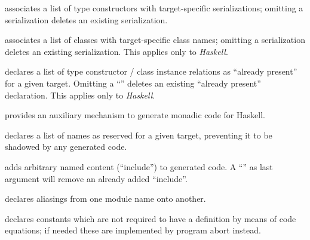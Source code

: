 \begin{isabellebody}
\begin{isamarkuptext}
\begin{description}
  \item \hyperlink{command.HOL.code-type}{\mbox{}} associates a list of type
  constructors with target-specific serializations; omitting a
  serialization deletes an existing serialization.

  \item \hyperlink{command.HOL.code-class}{\mbox{}} associates a list of classes
  with target-specific class names; omitting a serialization deletes
  an existing serialization.  This applies only to \emph{Haskell}.

  \item \hyperlink{command.HOL.code-instance}{\mbox{}} declares a list of type
  constructor / class instance relations as ``already present'' for a
  given target.  Omitting a ``\isa{{\isachardoublequote}{\isacharminus}{\isachardoublequote}}'' deletes an existing
  ``already present'' declaration.  This applies only to
  \emph{Haskell}.

  \item \hyperlink{command.HOL.code-monad}{\mbox{}} provides an auxiliary mechanism
  to generate monadic code for Haskell.

  \item \hyperlink{command.HOL.code-reserved}{\mbox{}} declares a list of names as
  reserved for a given target, preventing it to be shadowed by any
  generated code.

  \item \hyperlink{command.HOL.code-include}{\mbox{}} adds arbitrary named content
  (``include'') to generated code.  A ``\isa{{\isachardoublequote}{\isacharminus}{\isachardoublequote}}'' as last argument
  will remove an already added ``include''.

  \item \hyperlink{command.HOL.code-modulename}{\mbox{}} declares aliasings from one
  module name onto another.

  \item \hyperlink{command.HOL.code-abort}{\mbox{}} declares constants which are not
  required to have a definition by means of code equations; if
  needed these are implemented by program abort instead.


\end{description}
\end{isamarkuptext}
\end{isabellebody}
